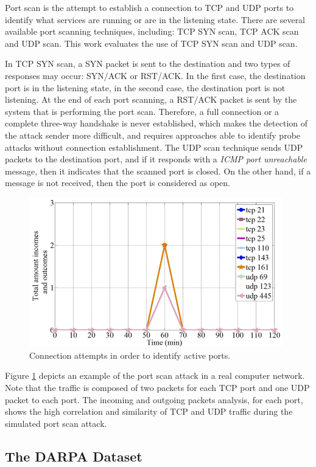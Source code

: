 Port scan is the attempt to establish a connection to TCP and UDP ports to identify what services are running or are in the listening state. There are several available port scanning techniques, including: TCP SYN scan, TCP ACK scan and UDP scan. This work evaluates the use of TCP SYN scan and UDP scan. 

In TCP SYN scan, a SYN packet is sent to the destination and two types of responses may occur: SYN/ACK or RST/ACK. In the first case, the destination port is in the listening state, in the second case, the destination port is not listening. At the end of each port scanning, a RST/ACK packet is sent by the system that is performing the port scan. Therefore, a full connection or a complete three-way handshake is never established, which makes the detection of the attack sender more difficult, and requires approaches able to identify probe attacks without connection establishment. The UDP scan technique sends UDP packets to the destination port, and if it responds with a \emph{ICMP port unreachable} message, then it indicates that the scanned port is closed. On the other hand, if a message is not received, then the port is considered as open.

\begin{figure}[h!]
     \centering 
     \includegraphics[width=11cm]{figures/fig07.png}
     \caption{Connection attempts in order to identify active ports.}
     \label{fig:2_fig7}
\end{figure}

Figure \ref{fig:2_fig7} depicts an example of the port scan attack in a real computer network. Note that the traffic is composed of two packets for each TCP port and one UDP packet to each port. The incoming and outgoing packets analysis, for each port, shows the high correlation and similarity of TCP and UDP traffic during the simulated port scan attack.

\subsection{The DARPA Dataset}
\label{sec:2_DarpaDataset}

